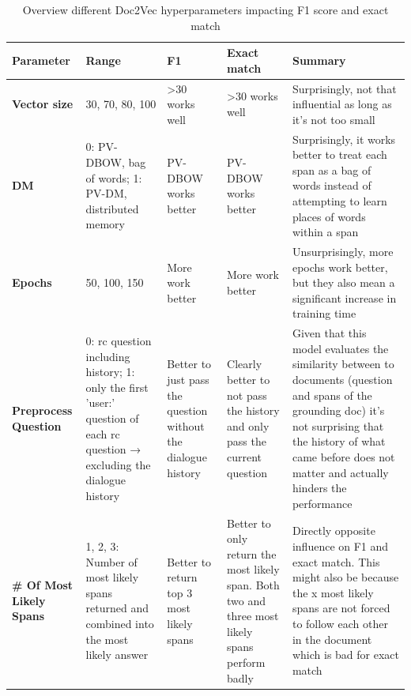 \documentclass[11pt]{article}
\begin{document}
    \begin{table}[p]
        \centering
        \begin{tabularx}{\textwidth} {|X|X|X|X|X|}
            \hline
            \textbf{Parameter} &
            \textbf{Range} &
            \textbf{F1} &
            \textbf{Exact match} &
            \textbf{Summary} \\ \hline
            \textbf{Vector size} &
            30, 70, 80, 100 &
            \textgreater{}30 works well &
            \textgreater{}30 works well &
            Surprisingly, not that influential as long as it's not too small \\ \hline
            \textbf{DM} &
            0: PV-DBOW, bag of words; 1: PV-DM, distributed memory &
            PV-DBOW works better &
            PV-DBOW works better &
            Surprisingly, it works better to treat each span as a bag of words instead of attempting to learn places of words within a span \\ \hline
            \textbf{Epochs} &
            50, 100, 150 &
            More work better &
            More work better &
            Unsurprisingly, more epochs work better, but they also mean a significant increase in training time \\ \hline
            \textbf{Preprocess Question} &
            0: rc question including history; 1: only the first 'user:' question of each rc question → excluding the dialogue history &
            Better to just pass the question without the dialogue history &
            Clearly better to not pass the history and only pass the current question &
            Given that this model evaluates the similarity between to documents (question and spans of the grounding doc)
            it's not surprising that the history of what came before does not matter and actually hinders the performance \\ \hline
            \textbf{\# Of Most Likely Spans} &
            1, 2, 3: Number of most likely spans returned and combined into the most likely answer &
            Better to return top 3 most likely spans &
            Better to only return the most likely span. Both two and three most likely spans perform badly &
            Directly opposite influence on F1 and exact match. This might also be because the x most likely spans are not
            forced to follow each other in the document which is bad for exact match \\ \hline
        \end{tabularx}
        \caption{Overview different Doc2Vec hyperparameters impacting F1 score and exact match}
        \label{table:simple-doc2vec-results}
    \end{table}
\end{document}
